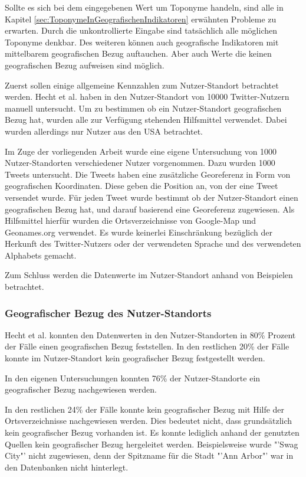 			Sollte es sich bei dem eingegebenen Wert um Toponyme handeln, sind alle in Kapitel \ref{sec:ToponymeInGeografischenIndikatoren} erwähnten Probleme zu erwarten.
			Durch die unkontrollierte Eingabe sind tatsächlich alle möglichen Toponyme denkbar.
			Des weiteren können auch geografische Indikatoren mit mittelbarem geografischen Bezug auftauchen.
			Aber auch Werte die keinen geografischen Bezug aufweisen sind möglich.	

			Zuerst sollen einige allgemeine Kennzahlen zum Nutzer-Standort betrachtet werden.
			Hecht et al. haben in \cite{Hecht2011} den Nutzer-Standort von 10000 Twitter-Nutzern manuell untersucht.
			Um zu bestimmen ob ein Nutzer-Standort geografischen Bezug hat, wurden alle zur Verfügung stehenden Hilfsmittel verwendet.
			Dabei wurden allerdings nur Nutzer aus den USA betrachtet.

			Im Zuge der vorliegenden Arbeit wurde eine eigene Untersuchung von 1000 Nutzer-Standorten verschiedener Nutzer vorgenommen.
			Dazu wurden 1000 Tweets untersucht.
			Die Tweets haben eine zusätzliche Georeferenz in Form von geografischen Koordinaten.
			Diese geben die Position an, von der eine Tweet versendet wurde.
			Für jeden Tweet wurde bestimmt ob der Nutzer-Standort einen geografischen Bezug hat, und darauf basierend eine Georeferenz zugewiesen.
			Als Hilfsmittel hierfür wurden die Ortsverzeichnisse von Google-Map und Geonames.org verwendet.
			Es wurde keinerlei Einschränkung bezüglich der Herkunft des Twitter-Nutzers oder der verwendeten Sprache und des verwendeten Alphabets gemacht.

			Zum Schluss werden die Datenwerte im Nutzer-Standort anhand von Beispielen betrachtet.


			\subsubsection{Geografischer Bezug des Nutzer-Standorts} 
				
				Hecht et al. konnten den Datenwerten in den Nutzer-Standorten in 80\% Prozent der Fälle einen geografischen Bezug feststellen.
				In den restlichen 20\% der Fälle konnte im Nutzer-Standort kein geografischer Bezug festgestellt werden. 

				In den eigenen Untersuchungen konnten 76\% der Nutzer-Standorte ein geografischer Bezug nachgewiesen werden. 

				In den restlichen 24\% der Fälle konnte kein geografischer Bezug mit Hilfe der Ortsverzeichnisse nachgewiesen werden. 
				Dies bedeutet nicht, dass grundsätzlich kein geografischer Bezug vorhanden ist. 
				Es konnte lediglich anhand der genutzten Quellen kein geografischer Bezug hergeleitet werden.
				Beispielsweise wurde "'Swag City"' nicht zugewiesen, denn der Spitzname für die Stadt "'Ann Arbor"' war in den Datenbanken nicht hinterlegt. 

